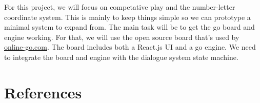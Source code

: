 \documentclass{scrartcl}
\begin{document}
For this project, we will focus on competative play and the number-letter coordinate system.
This is mainly to keep things simple so we can prototype a minimal system to expand from.
The main task will be to get the go board and engine working.
For that, we will use the open source board that's used by \url{online-go.com}. 
The board includes both a React.js UI and a go engine.
We need to integrate the board and engine with the dialogue system state machine.

\section{References}
\printbibliography[heading=none]
\end{document}
